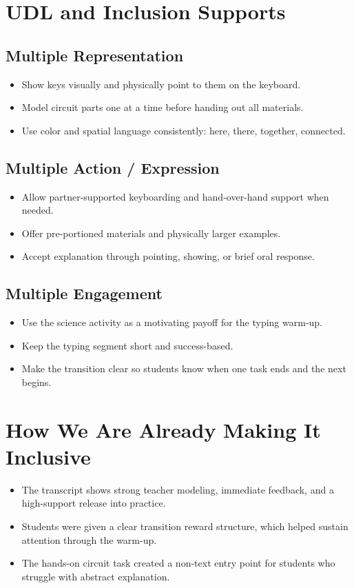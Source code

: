 \documentclass[11pt]{article}
\begin{document}
\section*{UDL and Inclusion Supports}
\subsection*{Multiple Representation}
\begin{itemize}[leftmargin=*]
\item Show keys visually and physically point to them on the keyboard.
\item Model circuit parts one at a time before handing out all materials.
\item Use color and spatial language consistently: here, there, together, connected.
\end{itemize}

\subsection*{Multiple Action / Expression}
\begin{itemize}[leftmargin=*]
\item Allow partner-supported keyboarding and hand-over-hand support when needed.
\item Offer pre-portioned materials and physically larger examples.
\item Accept explanation through pointing, showing, or brief oral response.
\end{itemize}

\subsection*{Multiple Engagement}
\begin{itemize}[leftmargin=*]
\item Use the science activity as a motivating payoff for the typing warm-up.
\item Keep the typing segment short and success-based.
\item Make the transition clear so students know when one task ends and the next begins.
\end{itemize}

\section*{How We Are Already Making It Inclusive}
\begin{itemize}[leftmargin=*]
\item The transcript shows strong teacher modeling, immediate feedback, and a high-support release into practice.
\item Students were given a clear transition reward structure, which helped sustain attention through the warm-up.
\item The hands-on circuit task created a non-text entry point for students who struggle with abstract explanation.
\end{itemize}
\end{document}
